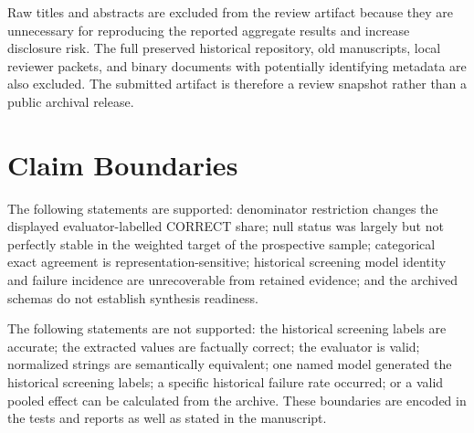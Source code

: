 \documentclass[acmsmall,anonymous,review]{acmart}
\begin{document}
Raw titles and abstracts are excluded from the review artifact because they are unnecessary for reproducing the reported aggregate results and increase disclosure risk. The full preserved historical repository, old manuscripts, local reviewer packets, and binary documents with potentially identifying metadata are also excluded. The submitted artifact is therefore a review snapshot rather than a public archival release.

\section{Claim Boundaries}

The following statements are supported: denominator restriction changes the displayed evaluator-labelled CORRECT share; null status was largely but not perfectly stable in the weighted target of the prospective sample; categorical exact agreement is representation-sensitive; historical screening model identity and failure incidence are unrecoverable from retained evidence; and the archived schemas do not establish synthesis readiness.

The following statements are not supported: the historical screening labels are accurate; the extracted values are factually correct; the evaluator is valid; normalized strings are semantically equivalent; one named model generated the historical screening labels; a specific historical failure rate occurred; or a valid pooled effect can be calculated from the archive. These boundaries are encoded in the tests and reports as well as stated in the manuscript.
\end{document}
